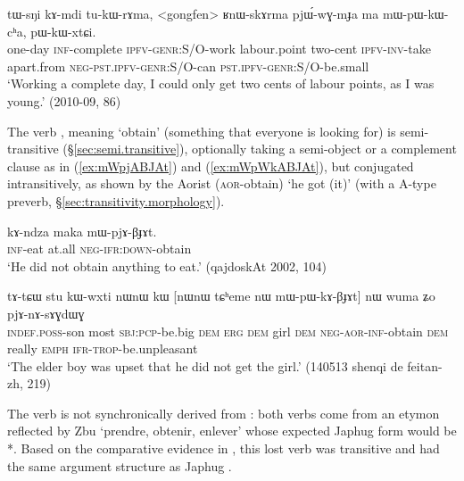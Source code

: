 \begin{exe}
\ex \label{ex:pjWGmJa.ma.mWpWkWcha}
\gll tɯ-sŋi kɤ-mdi tu-kɯ-rɤma, <gongfen> ʁnɯ-skɤrma pjɯ́-wɣ-mɟa ma mɯ-pɯ-kɯ-cʰa, pɯ-kɯ-xtɕi.  \\
one-day \textsc{inf}-complete \textsc{ipfv}-\textsc{genr}:S/O-work labour.point two-cent \textsc{ipfv}-\textsc{inv}-take apart.from \textsc{neg}-\textsc{pst}.\textsc{ipfv}-\textsc{genr}:S/O-can \textsc{pst}.\textsc{ipfv}-\textsc{genr}:S/O-be.small \\
\glt `Working a complete day, I could only get two cents of labour points, as I was young.' (2010-09, 86)
\end{exe}

The verb , meaning `obtain' (something that everyone is looking for) is semi-transitive (§\ref{sec:semi.transitive}), optionally taking a semi-object or a complement clause as in (\ref{ex:mWpjABJAt}) and (\ref{ex:mWpWkABJAt}), but conjugated intransitively, as shown by the Aorist  (\textsc{aor}-obtain) `he got (it)' (with a A-type preverb, §\ref{sec:transitivity.morphology}).

\begin{exe}
\ex \label{ex:mWpjABJAt}
\gll kɤ-ndza maka mɯ-pjɤ-βɟɤt.   \\
\textsc{inf}-eat at.all \textsc{neg}-\textsc{ifr}:\textsc{down}-obtain \\
\glt `He did not obtain anything to eat.' (qajdoskAt 2002, 104)
\end{exe}

\begin{exe}
\ex \label{ex:mWpWkABJAt}
\gll tɤ-tɕɯ stu kɯ-wxti nɯnɯ kɯ [nɯnɯ tɕʰeme nɯ mɯ-pɯ-kɤ-βɟɤt] nɯ wuma ʑo pjɤ-nɤ-sɤɣdɯɣ  \\
\textsc{indef}.\textsc{poss}-son most \textsc{sbj}:\textsc{pcp}-be.big \textsc{dem} \textsc{erg} \textsc{dem} girl \textsc{dem} \textsc{neg}-\textsc{aor}-\textsc{inf}-obtain \textsc{dem} really \textsc{emph} \textsc{ifr}-\textsc{trop}-be.unpleasant \\
\glt `The elder boy was upset that he did not get the girl.' (140513 shenqi de feitan-zh, 219)
\end{exe}

The verb  is not synchronically derived from : both verbs come from an etymon reflected by Zbu  `prendre, obtenir, enlever' \citep[310]{gong18these} whose expected Japhug form would be *. Based on the comparative evidence in \citet[310--311]{gong18these}, this lost verb was transitive and had the same argument structure as Japhug . 
 
